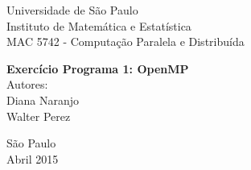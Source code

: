 %





\vspace*{-2cm}
{\bf
\begin{center}
{\large
\hspace*{0cm}Universidade de São Paulo} \\
\hspace*{0cm}Instituto de Matemática e Estatística \\
\hspace*{0cm}MAC 5742 - Computação Paralela e Distribuída  \\
\end{center}}
\vspace{4.0cm}
\noindent
\begin{center}
{\Large \bf Exercício Programa 1: OpenMP} \\[3cm]
{\Large Autores:}\\[6mm]
{\Large Diana Naranjo}\\[6mm]
{\Large Walter Perez}\\[6mm]
\end{center}




\vspace{8cm}
{\center São Paulo \\[3mm]
Abril 2015 \\}


\newpage
